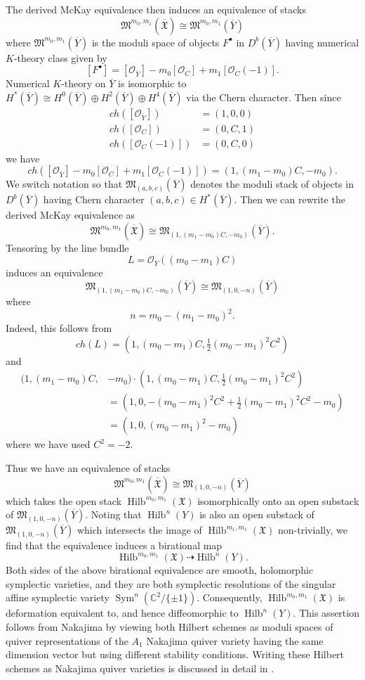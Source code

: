 \documentclass{amsart}
\theoremstyle{definition}
\newcommand{\CC} {{\mathbb C}}          %
\newcommand{\X}{\mathfrak{X}}
\newcommand{\Xbar}{\overline{\mathfrak{X}}}
\newcommand{\Ybar}{\overline{Y}}
\newcommand{\M}{\mathfrak{M}}
\renewcommand{\O}{\mathcal{O}}
\newcommand{\Sym}{\operatorname{Sym}}
\newcommand{\Hilb}{\operatorname{Hilb}}
\begin{document}
The derived McKay equivalence then induces an equivalence of stacks
\[
\M^{m_{0},m_{1}}(\Xbar ) \cong  \M^{m_{0},m_{1}}(\Ybar )
\]
where $ \M^{m_{0},m_{1}}(\Ybar )$ is the moduli space of objects
$F^{\bullet}$ in $D^{b}(\Ybar )$ having numerical $K$-theory class given by
\[
[F^{\bullet}] = [\O_{\Ybar }] - m_{0} [\O_{C}]+ m_{1} [\O_{C}(-1)]. 
\]
Numerical $K$-theory on $\Ybar $ is isomorphic to $H^{*}(\Ybar )\cong
H^{0}(\Ybar )\oplus H^{2}(\Ybar )\oplus H^{4}(\Ybar )$ via the Chern
character. Then since
\begin{align*}
ch([\O_{\Ybar }]) &= (1,0,0)\\
ch([\O_{C}]) &= (0,C,1)\\
ch([\O_{C}(-1)]) &= (0,C,0)
\end{align*}
we have
\[
ch( [\O_{\Ybar }] - m_{0} [\O_{C}]+ m_{1} [\O_{C}(-1)]) = (1,(m_{1}-m_{0})C,-m_{0}).
\]
We switch notation so that $\M_{(a,b,c)}(\Ybar )$ denotes the moduli
stack of objects in $D^{b}(\Ybar )$ having Chern character $(a,b,c)\in
H^{*}(\Ybar )$. Then we can rewrite the derived McKay equivalence as
\[
\M^{m_{0},m_{1}}(\Xbar ) \cong \M_{(1,(m_{1}-m_{0})C,-m_{0})}(\Ybar ). 
\]
Tensoring by the line bundle
\[
L = \O_{\Ybar }((m_{0}-m_{1})C)
\]
induces an equivalence
\[
\M_{(1,(m_{1}-m_{0})C,-m_{0})}(\Ybar ) \cong \M_{(1,0,-n)}(\Ybar )
\]
where
\[
n=m_{0} -(m_{1}-m_{0})^{2}. 
\]
Indeed, this follows from
\[
ch(L) = \left(1,(m_{0}-m_{1})C,\tfrac{1}{2} (m_{0}-m_{1})^{2}C^{2} \right)
\]
and 
\begin{align*}
(1,(m_{1}-m_{0})C,&-m_{0}) \cdot  (1,(m_{0}-m_{1})C,\tfrac{1}{2}
(m_{0}-m_{1})^{2}C^{2})\\
 &= (1,0, - (m_{0}-m_{1})^{2}C^{2} +\tfrac{1}{2}
(m_{0}-m_{1})^{2}C^{2} -m_{0})\\
&= (1,0,(m_{0}-m_{1})^{2}-m_{0})
\end{align*}
where we have used $C^{2}=-2$.

Thus we have an equivalence of stacks
\[
\M^{m_{0},m_{1}}(\Xbar ) \cong \M_{(1,0,-n)}(\Ybar )
\]
which takes the open stack $\Hilb^{m_{0},m_{1}}(\X )$ isomorphically
onto an open substack of $\M_{(1,0,-n)} (\Ybar )$. Noting that
$\Hilb^{n}(Y)$ is also an open substack of $\M_{(1,0,-n)} (\Ybar )$
which intersects the image of $\Hilb^{m_{1},m_{1}}(\X )$
non-trivially, we find that the equivalence induces a birational map
\[
\Hilb^{m_{0},m_{1}}(\X ) \dashrightarrow \Hilb^{n}(Y).
\]
Both sides of the above birational equivalence are smooth, holomorphic
symplectic varieties, and they are both symplectic resolutions of the
singular affine symplectic variety $\Sym^{n} (\CC^{2}/\{\pm 1
\})$. Consequently, $\Hilb^{m_{0},m_{1}}(\X )$ is deformation
equivalent to, and hence diffeomorphic to $\Hilb^{n}(Y)$. This
assertion follows from Nakajima \cite[Cor~4.2]{Nakajima1994Duke} by
viewing both Hilbert schemes as moduli spaces of quiver
representations of the $A_{1}$ Nakajima quiver variety having the same
dimension vector but using different stability conditions. Writing
these Hilbert schemes as Nakajima quiver varieties is discussed in
detail in \cite{Kuznetsov}.
\end{document}
